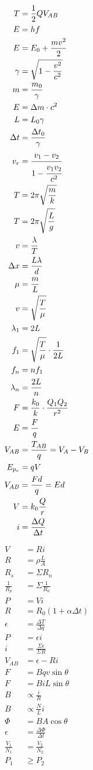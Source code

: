 \documentclass[12pt,a4paper]{article}
\begin{document}
		\begin{align}
			T &= \frac{1}{2} Q V_{AB} \\
			E &= hf \\
			E &= E_0 + \frac{mv^2}{2} \\
			\gamma &= \sqrt{1 - \frac{v^2}{c^2}} \\
			m &= \frac{m_0}{\gamma} \\
			E &= \Delta m \cdot c^2 \\
			L &= L_0 \gamma \\
			\Delta t &= \frac{\Delta t_0}{\gamma} \\
			v_r &= \cfrac{v_1 - v_2}{1 - \cfrac{v_1 v_2}{c^2}} \\
			T &= 2 \pi \sqrt{\frac{m}{k}} \\
			T &= 2 \pi \sqrt{\frac{L}{g}} \\
			v &= \frac{\lambda}{T} \\
			\Delta x &= \frac{L \lambda}{d} \\
			\mu &= \frac{m}{L} \\
			v &= \sqrt{\frac{T}{\mu}} \\
			\lambda_1 &= 2 L \\
			f_1 &= \sqrt{\frac{T}{\mu}} \cdot \frac{1}{2 L} \\
			f_n &= n f_1 \\
			\lambda_n &= \frac{2L}{n} \\
			F &= \frac{k_0}{k} \cdot \frac{Q_1 Q_2}{r^2} \\
			E &= \frac{F}{q} \\
			V_{AB} &= \frac{T_{AB}}{q} = V_A - V_B \\
			E_{p_e} &= q V \\
			V_{AB} &= \frac{Fd}{q} = Ed \\
			V &= k_0 \frac{Q}{r} \\
			i &= \frac{\Delta Q}{\Delta t}
		\end{align}

		\begin{align}
			V &= R i \\
			R &= \rho \frac{L}{A} \\
			R_s &= \Sigma R_n \\
			\frac{1}{R_p} &= \Sigma \frac{1}{R_n} \\
			P &= V i \\
			R &= R_0 (1 + \alpha \Delta t) \\
			\epsilon &= \frac{\Delta T}{\Delta q} \\
			P &= \epsilon i \\
			i &= \frac{\Sigma \epsilon}{\Sigma R} \\
			V_{AB} &= \epsilon - R i \\
			F &= B q v \sin \theta \\
			F &= B i L \sin \theta \\
			B &\propto \frac{i}{R} \\
			B &\propto \frac{N}{L} i \\
			\Phi &= B A \cos \theta \\
			\epsilon &= \frac{\Delta \Phi}{\Delta t} \\
			\frac{V_1}{N_1} &= \frac{V_2}{N_2} \\
			P_1 &\ge P_2
		\end{align}
\end{document}
